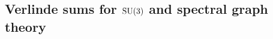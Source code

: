 \documentclass[11pt,reqno]{amsart}
\theoremstyle{remark}
\begin{document}




\subsection{Verlinde sums for \texorpdfstring{$\text{\rm SU}(3)$}{SU(3)} and spectral graph theory}
\end{document}
